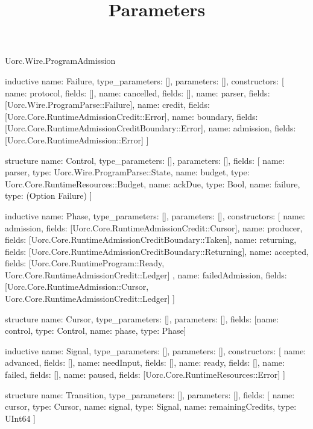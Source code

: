 \begin{lexlean}{Uorc.Wire.ProgramAdmission}
\title{Parameters}
\begin{semanticmodule}
inductive{
  name: Failure,
  type_parameters: [],
  parameters: [],
  constructors: [
    {name: protocol, fields: []},
    {name: cancelled, fields: []},
    {name: parser, fields: [Uorc.Wire.ProgramParse::Failure]},
    {name: credit, fields: [Uorc.Core.RuntimeAdmissionCredit::Error]},
    {name: boundary, fields: [Uorc.Core.RuntimeAdmissionCreditBoundary::Error]},
    {name: admission, fields: [Uorc.Core.RuntimeAdmission::Error]}
  ]
}

structure{
  name: Control,
  type_parameters: [],
  parameters: [],
  fields: [
    {name: parser, type: Uorc.Wire.ProgramParse::State},
    {name: budget, type: Uorc.Core.RuntimeResources::Budget},
    {name: ackDue, type: Bool},
    {name: failure, type: (Option Failure)}
  ]
}

inductive{
  name: Phase,
  type_parameters: [],
  parameters: [],
  constructors: [
    {name: admission, fields: [Uorc.Core.RuntimeAdmissionCredit::Cursor]},
    {name: producer, fields: [Uorc.Core.RuntimeAdmissionCreditBoundary::Taken]},
    {name: returning, fields: [Uorc.Core.RuntimeAdmissionCreditBoundary::Returning]},
    {
      name: accepted,
      fields: [Uorc.Core.RuntimeProgram::Ready, Uorc.Core.RuntimeAdmissionCredit::Ledger]
    },
    {
      name: failedAdmission,
      fields: [Uorc.Core.RuntimeAdmission::Cursor, Uorc.Core.RuntimeAdmissionCredit::Ledger]
    }
  ]
}

structure{
  name: Cursor,
  type_parameters: [],
  parameters: [],
  fields: [{name: control, type: Control}, {name: phase, type: Phase}]
}

inductive{
  name: Signal,
  type_parameters: [],
  parameters: [],
  constructors: [
    {name: advanced, fields: []},
    {name: needInput, fields: []},
    {name: ready, fields: []},
    {name: failed, fields: []},
    {name: paused, fields: [Uorc.Core.RuntimeResources::Error]}
  ]
}

structure{
  name: Transition,
  type_parameters: [],
  parameters: [],
  fields: [
    {name: cursor, type: Cursor},
    {name: signal, type: Signal},
    {name: remainingCredits, type: UInt64}
  ]
}


\end{semanticmodule}
\end{lexlean}
